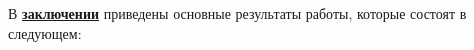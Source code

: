 В \underline{\textbf{заключении}} приведены основные результаты
работы, которые состоят в следующем: 




